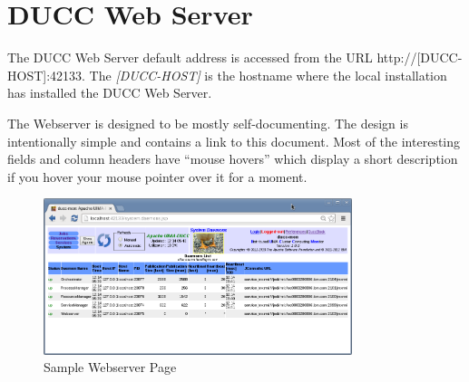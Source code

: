 % 
% 
% 
% 
\ifpdf
\else
{}
\fi
\chapter{DUCC Web Server}

    The DUCC Web Server default address is accessed from the URL http://[DUCC-HOST]:42133.  The
    {\em[DUCC-HOST]} is the hostname where the local installation has installed the DUCC
    Web Server.
    
  \begin{center}     
  \end{center}
  
    The Webserver is designed to be mostly self-documenting. The design is intentionally simple 
    and contains a link to this document.  Most of the interesting fields and column headers
    have ``mouse hovers'' which display a short 
    description if you hover your mouse pointer over it for a moment.

\begin{figure}[ht!]
\centering
\includegraphics[width=90mm]{images/ducc-webserver/System-Daemons.png}
\caption{Sample Webserver Page}
\end{figure}

